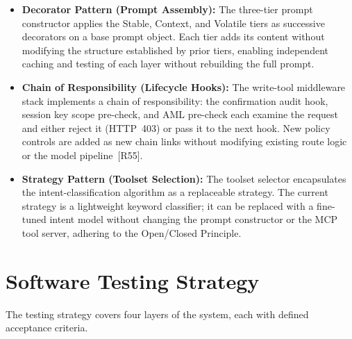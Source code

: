 \documentclass[12pt,a4paper]{report}
\begin{document}
\begin{itemize}[noitemsep]
\item \textbf{Decorator Pattern (Prompt Assembly):} The three-tier prompt
constructor applies the Stable, Context, and Volatile tiers as successive
decorators on a base prompt object. Each tier adds its content without modifying
the structure established by prior tiers, enabling independent caching and testing
of each layer without rebuilding the full prompt.

\item \textbf{Chain of Responsibility (Lifecycle Hooks):} The write-tool middleware
stack implements a chain of responsibility: the confirmation audit hook, session
key scope pre-check, and AML pre-check each examine the request and either reject
it (HTTP~403) or pass it to the next hook. New policy controls are added as new
chain links without modifying existing route logic or the model
pipeline~[R55].

\item \textbf{Strategy Pattern (Toolset Selection):} The toolset selector
encapsulates the intent-classification algorithm as a replaceable strategy. The
current strategy is a lightweight keyword classifier; it can be replaced with a
fine-tuned intent model without changing the prompt constructor or the MCP tool
server, adhering to the Open/Closed Principle.
\end{itemize}


\section{Software Testing Strategy}

The testing strategy covers four layers of the system, each with defined acceptance criteria.
\end{document}
